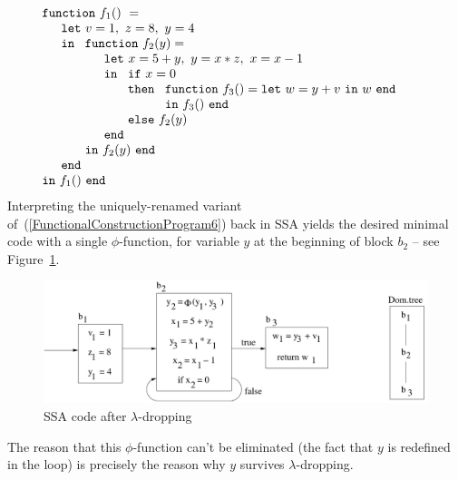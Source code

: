 \begin{equation}
\label{FunctionalConstructionProgram6}
\begin{array}{l}
\texttt{function}\ f_1()\ = \\
  \quad
  \begin{array}{l}
     \texttt{let}\ v = 1, \ 
                   z = 8, \ 
                   y = 4\\
     \texttt{in}\ 
     \begin{array}[t]{l}
       \texttt{function}\ f_2(y) =\\
         \quad
         \begin{array}{l}
           \texttt{let}\ x = 5+y,\
                         y = x*z,\
                         x = x-1\\
           \texttt{in}\
           \begin{array}[t]{l}
             \texttt{if}\ x=0\\ 
             \texttt{then}\ 
               \begin{array}[t]{l}
                 \texttt{function}\ f_3() = 
                 \texttt{let}\ w = y+v\ \texttt{in}\ w\ \texttt{end}\\
                 \texttt{in}\ f_3()\ \texttt{end}
               \end{array}\\
             \texttt{else}\ f_2(y)
           \end{array}\\
           \texttt{end}
         \end{array}\\
     \texttt{in}\ f_2(y)\ \texttt{end}
     \end{array}\\
     \texttt{end}\\
   \end{array}\\
\texttt{in}\ f_1()\  \texttt{end}
\end{array}
\end{equation}
Interpreting the uniquely-renamed variant
of~(\ref{FunctionalConstructionProgram6}) back in SSA yields the
desired minimal code with a single $\phi$-function, for variable $y$
at the beginning of block $b_2$ -- see
Figure~\ref{fig:FunctionalCorrespondenceSSAofLambdaDroppedCode}.
\begin{figure}
\begin{center}
\includegraphics[scale=0.4]{SSAConstructionExample3}
\end{center}
\caption{\label{fig:FunctionalCorrespondenceSSAofLambdaDroppedCode} SSA code after $\lambda$-dropping}
\end{figure}
The reason that this $\phi$-function can't be eliminated (the fact
that $y$ is redefined in the loop) is precisely the reason why $y$
survives $\lambda$-dropping.

